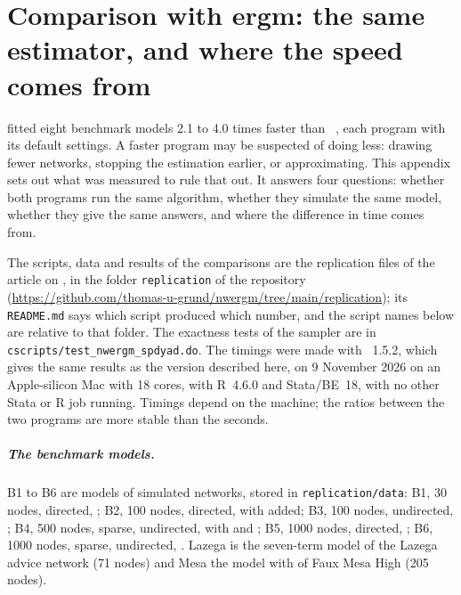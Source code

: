 \chapter[Comparison with ergm: the same estimator, and where the speed\texorpdfstring{\protect\newline}{ } comes from]{Comparison with ergm: the same estimator, and where the speed comes from}\label{app:samest}\label{sec:samplercheck}

\nwergm{} fitted eight benchmark models 2.1 to 4.0 times faster than \ergm{}~\ergmver{}, each program with its default settings. A faster program may be suspected of doing less: drawing fewer networks, stopping the estimation earlier, or approximating. This appendix sets out what was measured to rule that out. It answers four questions: whether both programs run the same algorithm, whether they simulate the same model, whether they give the same answers, and where the difference in time comes from.

The scripts, data and results of the comparisons are the replication files of the article on \nwergm{}, in the folder \texttt{replication} of the repository (\url{https://github.com/thomas-u-grund/nwergm/tree/main/replication}); its \texttt{README.md} says which script produced which number, and the script names below are relative to that folder. The exactness tests of the sampler are in \texttt{cscripts/test\_nwergm\_spdyad.do}. The timings were made with \nwergm{}~1.5.2, which gives the same results as the version described here, on 9 November 2026 on an Apple-silicon Mac with 18 cores, with R~4.6.0 and Stata/BE~18, with no other Stata or R job running. Timings depend on the machine; the ratios between the two programs are more stable than the seconds.

\paragraph{The benchmark models.} B1 to B6 are models of simulated networks, stored in \texttt{replication/data}: B1, 30 nodes, directed, ; B2, 100 nodes, directed, with  added; B3, 100 nodes, undirected, ; B4, 500 nodes, sparse, undirected, with  and ; B5, 1000 nodes, directed, ; B6, 1000 nodes, sparse, undirected, . Lazega is the seven-term model of the Lazega advice network (71 nodes) and Mesa the model with  of Faux Mesa High (205 nodes).

